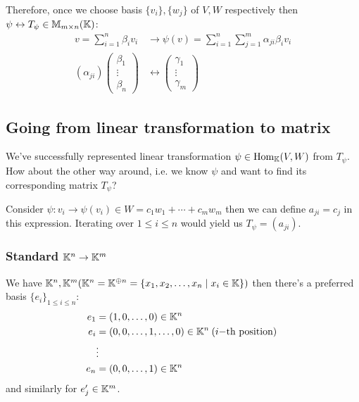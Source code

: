 Therefore, once we choose basis \(\{v_i\}, \{w_j\}\) of \(V, W\) respectively then \(\psi \leftrightarrow T_\psi \in \mathbb{M}_{m \times n}(\mathbb{K})\):
\begin{align*}
    v = \sum_{i=1}^{n} \beta_i v_i       & \rightarrow \psi(v) = \sum_{i=1}^{n} \sum_{j=1}^{m} \alpha_{ji} \beta_i v_i \\
    (\alpha_{ji}) \left(\begin{array}{c}
                                \beta_1 \\ \vdots \\ \beta_n
                            \end{array}\right) & \leftrightarrow \left(\begin{array}{c}
                                                                           \gamma_1 \\ \vdots \\ \gamma_m
                                                                       \end{array}\right)
\end{align*}

\subsection{Going from linear transformation to matrix}
We've successfully represented linear transformation \(\psi \in \mathrm{Hom}_{\mathbb{K}}(V, W)\) from \(T_\psi\). How about the other way around, i.e. we know \(\psi\) and want to find its corresponding matrix \(T_\psi\)?

Consider \(\psi: v_i \to \psi(v_i) \in W = c_1 w_1 + \cdots + c_m w_m\) then we can define \(a_{ji} = c_j\) in this expression. Iterating over \(1 \leq i \leq n\) would yield us \(T_\psi = (a_{ji})\).

\subsubsection{Standard \(\mathbb{K}^n \to \mathbb{K}^m\)}
We have \(\mathbb{K}^n, \mathbb{K}^m (\mathbb{K}^n = \mathbb{K}^{\oplus n} = \{x_1, x_2, \ldots, x_n \mid x_i \in \mathbb{K}\})\) then there's a preferred basis \(\{e_i\}_{1 \leq i \leq n}\):
\begin{align*}
    e_1 & = (1, 0, \ldots, 0) \in \mathbb{K}^n                                            \\
    e_i & = (0, 0, \ldots, 1, \ldots, 0) \in \mathbb{K}^n  \:\text{(\(i-\)th position)}\: \\
        & \vdots                                                                    \\
    e_n & = (0, 0, \ldots, 1) \in \mathbb{K}^n
\end{align*}
and similarly for \(e'_j \in \mathbb{K}^m\).

